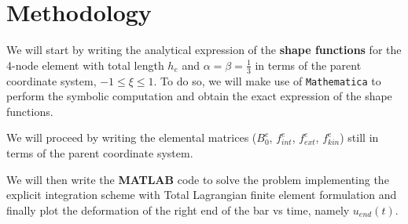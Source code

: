 \section{Methodology}
\label{sec:methodology}

We will start by writing the analytical expression of the \textbf{shape functions} for the 4-node element with total length $h_e$ and $\alpha = \beta = \frac{1}{3}$ in terms of the parent coordinate system, $-1 \leq \xi \leq 1$.
To do so, we will make use of \texttt{Mathematica} to perform the symbolic computation and obtain the exact expression of the shape functions.

We will proceed by writing the elemental matrices ($B_0^e$, $f_{int}^e$, $f_{ext}^e$, $f_{kin}^e$) still in terms of the parent coordinate system.

We will then write the \textbf{MATLAB} code to solve the problem implementing the explicit integration scheme with Total Lagrangian finite element formulation and finally plot the deformation of the right end of the bar vs time, namely $u_{end}(t)$.